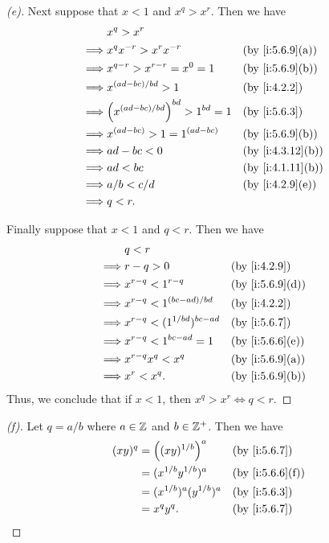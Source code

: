 \begin{proof}[(e)]
  Next suppose that \(x < 1\) and \(x^q > x^r\).
  Then we have
  \begin{align*}
             & x^q > x^r                                                       \\
    \implies & x^q x^{-r} > x^r x^{-r}                   &  & \by{i:5.6.9}[a]  \\
    \implies & x^{q - r} > x^{r - r} = x^0 = 1           &  & \by{i:5.6.9}[b]  \\
    \implies & x^{(ad - bc) / bd} > 1                    &  & \by{i:4.2.2}     \\
    \implies & \pa{x^{(ad - bc) / bd}}^{bd} > 1^{bd} = 1 &  & \by{i:5.6.3}     \\
    \implies & x^{(ad - bc)} > 1 = 1^{(ad - bc)}         &  & \by{i:5.6.9}[b]  \\
    \implies & ad - bc < 0                               &  & \by{i:4.3.12}[b] \\
    \implies & ad < bc                                   &  & \by{i:4.1.11}[b] \\
    \implies & a / b < c / d                             &  & \by{i:4.2.9}[e]  \\
    \implies & q < r.
  \end{align*}

  Finally suppose that \(x < 1\) and \(q < r\).
  Then we have
  \begin{align*}
             & q < r                                                   \\
    \implies & r - q > 0                          &  & \by{i:4.2.9}    \\
    \implies & x^{r - q} < 1^{r - q}              &  & \by{i:5.6.9}[d] \\
    \implies & x^{r - q} < 1^{(bc - ad) / bd}     &  & \by{i:4.2.2}    \\
    \implies & x^{r - q} < (1^{1 / bd})^{bc - ad} &  & \by{i:5.6.7}    \\
    \implies & x^{r - q} < 1^{bc - ad} = 1        &  & \by{i:5.6.6}[e] \\
    \implies & x^{r - q} x^q < x^q                &  & \by{i:5.6.9}[a] \\
    \implies & x^r < x^q.                         &  & \by{i:5.6.9}[b]
  \end{align*}
  Thus, we conclude that if \(x < 1\), then \(x^q > x^r \iff q < r\).
\end{proof}

\begin{proof}[(f)]
  Let \(q = a / b\) where \(a \in \mathbb{Z}\) and \(b \in \mathbb{Z}^+\).
  Then we have
  \begin{align*}
    (xy)^q & = \pa{(xy)^{1 / b}}^a         &  & \by{i:5.6.7}    \\
           & = (x^{1 / b} y^{1 / b})^a     &  & \by{i:5.6.6}[f] \\
           & = (x^{1 / b})^a (y^{1 / b})^a &  & \by{i:5.6.3}    \\
           & = x^q y^q.                    &  & \by{i:5.6.7}
  \end{align*}
\end{proof}

